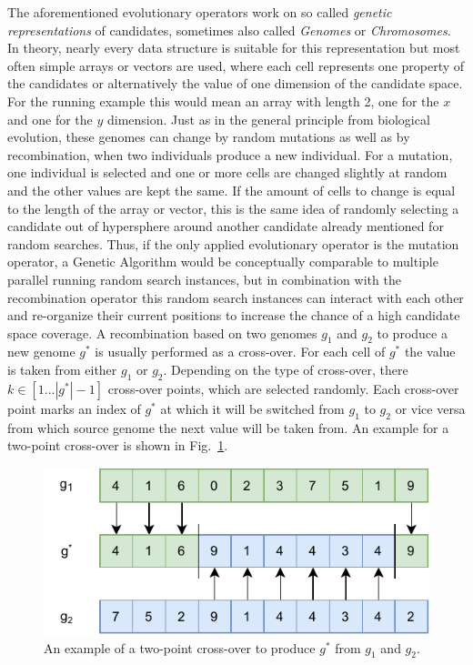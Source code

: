The aforementioned evolutionary operators work on so called \textit{genetic representations} of candidates, sometimes also called \textit{Genomes} or \textit{Chromosomes}.
In theory, nearly every data structure is suitable for this representation but most often simple arrays or vectors are used, where each cell represents one property of the candidates or alternatively the value of one dimension of the candidate space.
For the running example this would mean an array with length 2, one for the $x$ and one for the $y$ dimension.\newline
Just as in the general principle from biological evolution, these genomes can change by random mutations as well as by recombination, when two individuals produce a new individual.
For a mutation, one individual is selected and one or more cells are changed slightly at random and the other values are kept the same.
If the amount of cells to change is equal to the length of the array or vector, this is the same idea of randomly selecting a candidate out of hypersphere around another candidate already mentioned for random searches.
Thus, if the only applied evolutionary operator is the mutation operator, a Genetic Algorithm would be conceptually comparable to multiple parallel running random search instances, but in combination with the recombination operator this random search instances can interact with each other and re-organize their current positions to increase the chance of a high candidate space coverage.\newline
A recombination based on two genomes $g_1$ and $g_2$ to produce a new genome $g^*$ is usually performed as a cross-over.
For each cell of $g^*$ the value is taken from either $g_1$ or $g_2$.
Depending on the type of cross-over, there $k \in [1 ... |g^*| - 1]$ cross-over points, which are selected randomly.
Each cross-over point marks an index of $g^*$ at which it will be switched from $g_1$ to $g_2$ or vice versa from which source genome the next value will be taken from.
An example for a two-point cross-over is shown in Fig.~\ref{fig:theory:crossover}.
\begin{figure}[ht!]
    \centering
    \includegraphics[width=\textwidth]{gfx/Figures/Theory/Crossover.pdf}
    \caption{An example of a two-point cross-over to produce $g^*$ from $g_1$ and $g_2$.}
    \label{fig:theory:crossover}
\end{figure}

